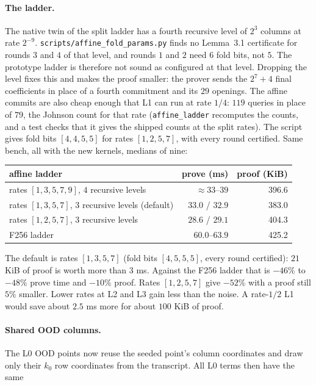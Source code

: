 \documentclass[11pt]{article}
\begin{document}
\paragraph{The ladder.} The native twin of the split ladder has a fourth
recursive level of $2^3$ columns at rate $2^{-9}$.
\texttt{scripts/affine\_fold\_params.py} finds no Lemma~3.1 certificate
for rounds $3$ and $4$ of that level, and rounds $1$ and $2$ need $6$
fold bits, not $5$. The prototype ladder is therefore not sound as
configured at that level. Dropping the level fixes this and makes the
proof smaller: the prover sends the $2^7 + 4$ final coefficients in
place of a fourth commitment and its $29$ openings. The affine commits
are also cheap enough that L1 can run at rate $1/4$: $119$ queries in
place of $79$, the Johnson count for that rate (\texttt{affine\_ladder}
recomputes the counts, and a test checks that it gives the shipped
counts at the split rates). The script gives fold bits $[4, 4, 5, 5]$
for rates $[1, 2, 5, 7]$, with every round certified. Same bench, all
with the new kernels, medians of nine:
\begin{center}
\begin{tabular}{lrr}
\toprule
affine ladder & prove (ms) & proof (KiB) \\
\midrule
rates $[1,3,5,7,9]$, $4$ recursive levels & $\approx 33$--$39$ & 396.6 \\
rates $[1,3,5,7]$, $3$ recursive levels (default) & $33.0$ / $32.9$ & 383.0 \\
rates $[1,2,5,7]$, $3$ recursive levels & $28.6$ / $29.1$ & 404.3 \\
F256 ladder & $60.0$--$63.9$ & 425.2 \\
\bottomrule
\end{tabular}
\end{center}
The default is rates $[1,3,5,7]$ (fold bits $[4,5,5,5]$, every round
certified): $21$ KiB of proof is worth more than $3$ ms. Against the
F256 ladder that is $-46\%$ to $-48\%$ prove time and $-10\%$ proof. Rates
$[1,2,5,7]$ give $-52\%$ with a proof still $5\%$ smaller. Lower rates at L2 and L3 gain
less than the noise. A rate-$1/2$ L1 would save about $2.5$ ms more
for about $100$ KiB of proof. \paragraph{Shared OOD columns.} The L0 OOD points now reuse the
seeded point's column coordinates and draw only their $k_0$ row
coordinates from the transcript. All L0 terms then have the same
\end{document}
